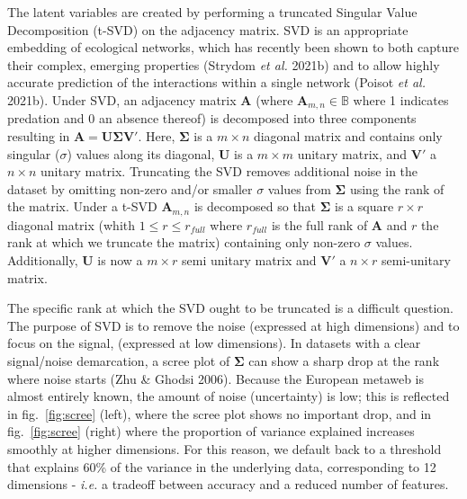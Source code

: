 \documentclass[11pt]{article}
\makeatletter
\def\maxwidth{\ifdim\Gin@nat@width>\linewidth\linewidth
\else\Gin@nat@width\fi}
\let\Oldincludegraphics\includegraphics
\renewcommand{\includegraphics}[1]{\Oldincludegraphics[width=\maxwidth]{#1}}
\providecommand{\DIFaddtex}[1]{{\bf #1}} %
\providecommand{\DIFdeltex}[1]{} %
\providecommand{\DIFaddbegin}{\protect\color{blue}} %
\providecommand{\DIFaddend}{\protect\color{black}} %
\providecommand{\DIFdelbegin}{\protect\color{red}} %
\providecommand{\DIFdelend}{\protect\color{black}} %
\providecommand{\DIFadd}[1]{\texorpdfstring{\DIFaddtex{#1}}{#1}} %
\providecommand{\DIFdel}[1]{\texorpdfstring{\DIFdeltex{#1}}{}} %
\newcommand{\DIFscaledelfig}{0.5}
\newlength{\DIFdelgraphicswidth} %
\newlength{\DIFdelgraphicsheight} %
\newcommand{\DIFaddincludegraphics}[2][]{{\color{blue}\fbox{\DIFOincludegraphics[#1]{#2}}}} %
\newcommand{\DIFdelincludegraphics}[2][]{%
\sbox{\DIFdelgraphicsbox}{\DIFOincludegraphics[#1]{#2}}%
\settoboxwidth{\DIFdelgraphicswidth}{\DIFdelgraphicsbox} %
\settoboxtotalheight{\DIFdelgraphicsheight}{\DIFdelgraphicsbox} %
\scalebox{\DIFscaledelfig}{%
\parbox[b]{\DIFdelgraphicswidth}{\usebox{\DIFdelgraphicsbox}\\[-\baselineskip] \rule{\DIFdelgraphicswidth}{0em}}\llap{\resizebox{\DIFdelgraphicswidth}{\DIFdelgraphicsheight}{%
\setlength{\unitlength}{\DIFdelgraphicswidth}%
\begin{picture}(1,1)%
\thicklines\linethickness{2pt} %
{\color[rgb]{1,0,0}\put(0,0){\framebox(1,1){}}}%
{\color[rgb]{1,0,0}\put(0,0){\line( 1,1){1}}}%
{\color[rgb]{1,0,0}\put(0,1){\line(1,-1){1}}}%
\end{picture}%
}\hspace*{3pt}}} %
} %
\DeclareRobustCommand{\DIFaddbegin}{\DIFOaddbegin \let\includegraphics\DIFaddincludegraphics} %
\DeclareRobustCommand{\DIFaddend}{\DIFOaddend \let\includegraphics\DIFOincludegraphics} %
\DeclareRobustCommand{\DIFdelbegin}{\DIFOdelbegin \let\includegraphics\DIFdelincludegraphics} %
\DeclareRobustCommand{\DIFdelend}{\DIFOaddend \let\includegraphics\DIFOincludegraphics} %
\makeatother
\begin{document}
The latent variables are created by performing a truncated Singular
Value Decomposition (t-SVD) on the adjacency matrix. SVD is an
appropriate embedding of ecological networks, which has recently been
shown to both capture their complex, emerging properties (Strydom
\emph{et al.} 2021b) and to allow highly accurate prediction of the
interactions within a single network (Poisot \emph{et al.} 2021b). Under
SVD, an adjacency matrix \(\mathbf{A}\) (where
\(\mathbf{A}_{m,n}\in\mathbb{B}\) where 1 indicates predation and 0 an
absence thereof) is decomposed into three components resulting in
\DIFdelbegin \DIFdel{\(\mathbf{A} = \mathbf{L}\mathbf{\Sigma}\mathbf{R'}.\) }\DIFdelend \DIFaddbegin \DIFadd{\(\mathbf{A} = \mathbf{U}\mathbf{\Sigma}\mathbf{V'}.\) }\DIFaddend Here,
\(\mathbf{\Sigma}\) is a \(m \times n\) diagonal matrix and contains
only singular (\(\sigma\)) values along its diagonal, \DIFdelbegin \DIFdel{\(\mathbf{L}\) }\DIFdelend \DIFaddbegin \DIFadd{\(\mathbf{U}\) }\DIFaddend is
a \(m \times m\) unitary matrix, and \DIFdelbegin \DIFdel{\(\mathbf{R}'\) }\DIFdelend \DIFaddbegin \DIFadd{\(\mathbf{V}'\) }\DIFaddend a \(n \times n\)
unitary matrix. Truncating the SVD removes additional noise in the
dataset by omitting non-zero and/or smaller \(\sigma\) values from
\(\mathbf{\Sigma}\) using the rank of the matrix. Under a t-SVD
\(\mathbf{A}_{m,n}\) is decomposed so that \(\mathbf{\Sigma}\) is a
square \(r \times r\) diagonal matrix (whith \(1 \le r \le r_{full}\)
where \(r_{full}\) is the full rank of \(\mathbf{A}\) and \(r\) the rank
at which we truncate the matrix) containing only non-zero \(\sigma\)
values. Additionally, \DIFdelbegin \DIFdel{\(\mathbf{L}\) }\DIFdelend \DIFaddbegin \DIFadd{\(\mathbf{U}\) }\DIFaddend is now a \(m \times r\) semi
unitary matrix and \DIFdelbegin \DIFdel{\(\mathbf{R}'\) }\DIFdelend \DIFaddbegin \DIFadd{\(\mathbf{V}'\) }\DIFaddend a \(n \times r\) semi-unitary matrix.

The specific rank at which the SVD ought to be truncated is a difficult
question. The purpose of SVD is to remove the noise (expressed at high
dimensions) and to focus on the signal, (expressed at low dimensions).
In datasets with a clear signal/noise demarcation, a scree plot of
\(\mathbf{\Sigma}\) can show a sharp drop at the rank where noise starts
(Zhu \& Ghodsi 2006). Because the European metaweb is almost entirely
known, the amount of noise (uncertainty) is low; this is reflected in
fig.~\ref{fig:scree} (left), where the scree plot shows no important
drop, and in fig.~\ref{fig:scree} (right) where the proportion of
variance explained increases smoothly at higher dimensions. For this
reason, we default back to a threshold that explains 60\% of the
variance in the underlying data, corresponding to 12 dimensions -
\emph{i.e.} a tradeoff between accuracy and a reduced number of
features.
\end{document}
